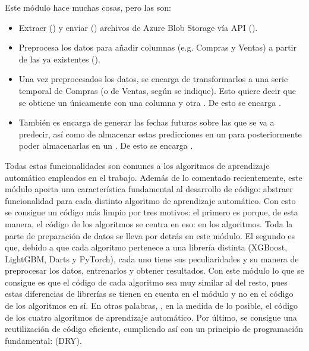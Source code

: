 Este módulo hace muchas cosas, pero las  son:
\begin{itemize}
	\item Extraer () y enviar () archivos de Azure Blob Storage vía API ().
	\item Preprocesa los datos para añadir columnas (e.g. Compras y Ventas) a partir de las ya existentes ().
	\item Una vez preprocesados los datos, se encarga de transformarlos a una serie temporal de Compras (o de Ventas, según se indique). Esto quiere decir que se obtiene un  únicamente con una columna  y otra . De esto se encarga .
	\item También es encarga de generar las fechas futuras sobre las que se va a predecir, así como de almacenar estas predicciones en un  para posteriormente poder almacenarlas en un . De esto se encarga .
\end{itemize}

Todas estas funcionalidades son comunes a los algoritmos de aprendizaje automático empleados en el trabajo. Además de lo comentado recientemente, este módulo aporta una característica fundamental al desarrollo de código: abstraer funcionalidad  para cada distinto algoritmo de aprendizaje automático. Con esto se consigue un código más limpio por tres motivos: el primero es porque, de esta manera, el código de los algoritmos se centra en eso: en los algoritmos. Toda la parte de preparación de datos se lleva por detrás en este módulo. El segundo es que, debido a que cada algoritmo pertenece a una librería distinta (XGBoost, LightGBM, Darts y PyTorch), cada uno tiene sus peculiaridades y su manera de preprocesar los datos, entrenarlos y obtener resultados. Con  este módulo lo que se consigue es que el código de cada algoritmo sea muy similar al del resto, pues estas diferencias de librerías se tienen en cuenta en el módulo y no en el código de los algoritmos en sí. En otras palabras, , en la medida de lo posible, el código de los cuatro algoritmos de aprendizaje automático. Por último, se consigue una reutilización de código eficiente, cumpliendo así con un principio de programación fundamental:  (DRY).

